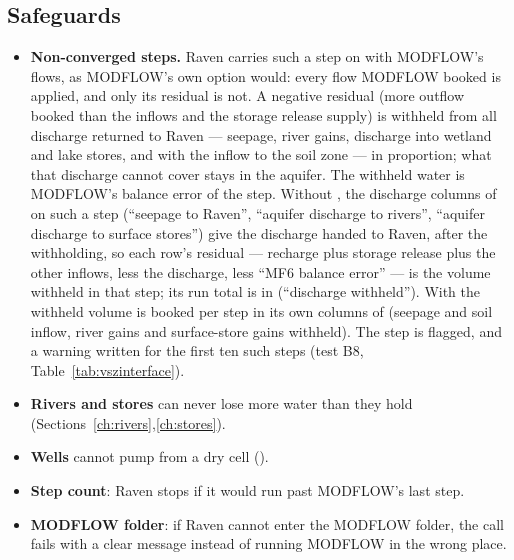 \subsection{Safeguards}\label{sec:guard}
\begin{itemize}
\item \textbf{Non-converged steps.} Raven carries such a step on with MODFLOW's flows, as MODFLOW's own
 option would: every flow MODFLOW booked is applied, and only its residual is not. A negative residual
(more outflow booked than the inflows and the storage release supply) is withheld from all discharge returned to Raven
--- seepage, river gains, discharge into wetland and lake stores, and with  the inflow to the
soil zone --- in proportion; what that discharge cannot cover stays in the aquifer. The withheld water is MODFLOW's
balance error of the step. Without , the discharge columns of  on such a step
(``seepage to Raven'', ``aquifer discharge to rivers'', ``aquifer discharge to surface stores'') give the discharge
handed to Raven, after the withholding, so each row's residual --- recharge plus storage release plus the other inflows,
less the discharge, less ``MF6 balance error'' --- is the volume withheld in that step; its run total is in
 (``discharge withheld''). With  the withheld volume is booked per step
in its own columns of  (seepage and soil inflow, river gains and surface-store gains withheld). The step is
flagged, and a warning written for the first ten such steps (test B8, Table~\ref{tab:vszinterface}).
\item \textbf{Rivers and stores} can never lose more water than they hold (Sections~\ref{ch:rivers},\ref{ch:stores}).
\item \textbf{Wells} cannot pump from a dry cell ().
\item \textbf{Step count}: Raven stops if it would run past MODFLOW's last step.
\item \textbf{MODFLOW folder}: if Raven cannot enter the MODFLOW folder, the call fails with a clear message instead of
running MODFLOW in the wrong place.
\end{itemize}

